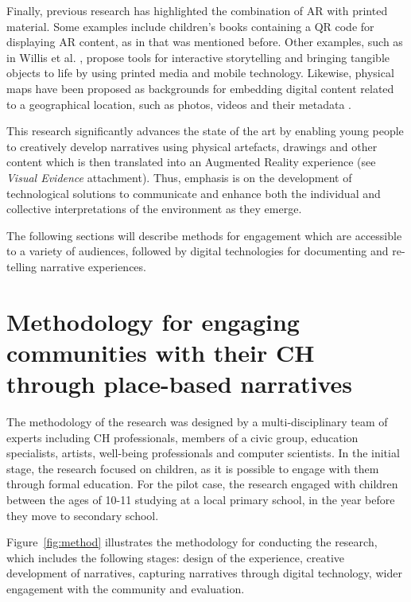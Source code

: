 \documentclass[acmlarge,screen,dvipsnames]{acmart}
\begin{document}
Finally, previous research has highlighted the combination of AR with printed material. Some examples include children's books containing a QR code for displaying AR content, as in \cite{ALHUMAIDAN201824} that was mentioned before. Other examples, such as in Willis et al. \cite{10.1145/2460625.2460682}, propose tools for interactive storytelling and bringing tangible objects to life by using printed media and mobile technology. Likewise, physical maps have been proposed as backgrounds for embedding digital content related to a geographical location, such as photos, videos and their metadata \cite{Morrison:2009:LBA:1518701.1518991,
Terracciano:2017:MMR:3027063.3052958}.

This research significantly advances the state of the art by enabling young people to creatively develop narratives using physical artefacts, drawings and other content which is then translated into an Augmented Reality experience (see \textit{Visual Evidence} attachment). Thus, emphasis is on the
development of technological solutions to communicate and enhance both the individual and collective interpretations of the environment as they emerge.

The following sections will describe methods for engagement which are
accessible to a variety of audiences, followed by digital technologies for
documenting and re-telling narrative experiences. 

\section{Methodology for engaging communities with their CH through place-based narratives} 
\label{meth} The methodology of the research was designed by
a multi-disciplinary team of experts including CH
professionals, members of a civic group, education specialists, artists,
well-being professionals and computer scientists. In the initial stage, the
research focused on children, as it is possible to engage with them through
formal education. For the pilot case, the research engaged with children between
the ages of 10-11 studying at a local primary school, in the year before they
move to secondary school.

Figure~\ref{fig:method} illustrates the methodology for conducting the
research, which includes the following stages: design of the experience,
creative development of narratives, capturing narratives through digital
technology, wider engagement with the community and evaluation.
\end{document}
